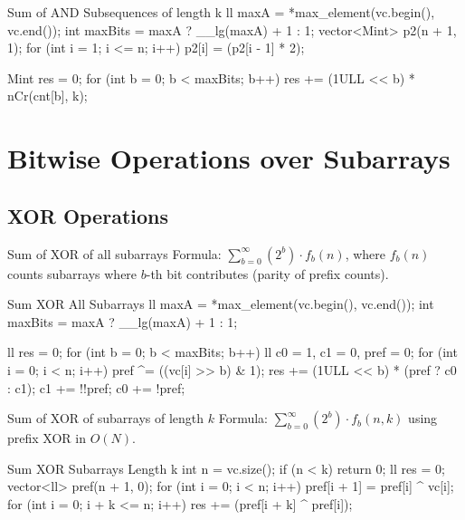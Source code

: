 \documentclass[10pt]{article}
\newcommand{\complexity}[1]{%
  \tcbox[on line,
    colback=tagbg,
    colframe=tagbg,
    boxrule=0pt,
    arc=2pt,
    boxsep=0pt,
    left=3.5pt, right=3.5pt, top=1.5pt, bottom=1.5pt
  ]{\color{tagtext}\scriptsize\bfseries\ensuremath{#1}}%
}
\begin{document}
\begin{vscode}{Sum of AND Subsequences of length k \complexity{O(N \log(\max A))}}
ll maxA = *max_element(vc.begin(), vc.end());
int maxBits = maxA ? __lg(maxA) + 1 : 1;
vector<Mint> p2(n + 1, 1);
for (int i = 1; i <= n; i++) 
    p2[i] = (p2[i - 1] * 2);

Mint res = 0;
for (int b = 0; b < maxBits; b++) 
    res += (1ULL << b) * nCr(cnt[b], k);
\end{vscode}

\newpage
\section{Bitwise Operations over Subarrays}

\subsection{XOR Operations}

\begin{conceptbox}{Sum of XOR of all subarrays}
    Formula: $\sum_{b = 0}^{\infty} (2^b) \cdot f_b(n)$, where $f_b(n)$ counts subarrays where $b$-th bit contributes (parity of prefix counts).
\end{conceptbox}

\begin{vscode}{Sum XOR All Subarrays \complexity{O(N \log(\max A))}}
ll maxA = *max_element(vc.begin(), vc.end());
int maxBits = maxA ? __lg(maxA) + 1 : 1;

ll res = 0;
for (int b = 0; b < maxBits; b++) 
{
    ll c0 = 1, c1 = 0, pref = 0;
    for (int i = 0; i < n; i++) 
    {
        pref ^= ((vc[i] >> b) & 1);
        res += (1ULL << b) * (pref ? c0 : c1);
        c1 += !!pref; 
        c0 += !pref;
    }
}
\end{vscode}

\begin{conceptbox}{Sum of XOR of subarrays of length $k$}
    Formula: $\sum_{b = 0}^{\infty} (2^b) \cdot f_b(n, k)$ using prefix XOR in $O(N)$.
\end{conceptbox}

\begin{vscode}{Sum XOR Subarrays Length k \complexity{O(N)}}
int n = vc.size();
if (n < k) 
    return 0;
ll res = 0;
vector<ll> pref(n + 1, 0);
for (int i = 0; i < n; i++) 
    pref[i + 1] = pref[i] ^ vc[i];
for (int i = 0; i + k <= n; i++)
    res += (pref[i + k] ^ pref[i]);
\end{vscode}
\end{document}
